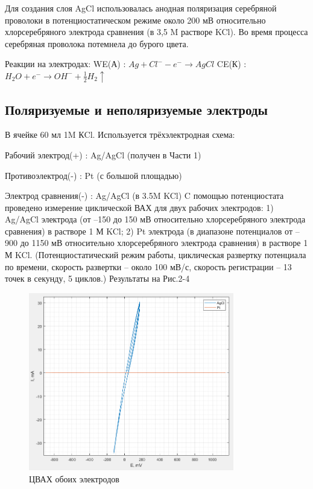 \documentclass[a4paper, 12pt]{article}
\begin{document}
Для создания слоя AgCl использовалась анодная поляризация серебряной проволоки в потенциостатическом режиме около 200 мВ относительно хлорсеребряного электрода сравнения (в 3,5 M растворе KCl). Во время процесса серебряная проволока потемнела до бурого цвета. 

Реакции на электродах: \newline
WE(А) : $Ag + Cl^- - e^- \rightarrow AgCl$ \newline
CE(К) : $H_{2}O + e^- \rightarrow OH^- + \frac{1}{2} H_2 \uparrow$

\subsection{Поляризуемые и неполяризуемые электроды}

В ячейке 60 мл 1M КCl. Используется трёхэлектродная схема:

Рабочий электрод(+) : Ag/AgCl (получен в Части 1)

Противоэлектрод(-) : Pt (с большой площадью)

Электрод сравнения(-) : Ag/AgCl (в 3.5M KCl) \newline
C помощью потенциостата проведено измерение циклической ВАХ для двух рабочих электродов:
1) Ag/AgCl электрода (от –150 до 150 мВ относительно хлорсеребряного
электрода сравнения) в растворе 1 М KCl;
2) Pt электрода (в диапазоне потенциалов от –900 до 1150 мВ относительно
хлорсеребряного электрода сравнения) в растворе 1 М KCl. \newline
(Потенциостатический режим работы, циклическая развертку потенциала по времени, скорость развертки – около 100 мВ/с, скорость регистрации – 13 точек в секунду, 5 циклов.)\newline
Результаты на Рис.2-4

\begin{figure}[h!]
    \begin{center}
    \includegraphics[width=0.8\textwidth]{2 both.png}
    \end{center}
    \caption{ЦВАХ обоих электродов}
\end{figure}
\end{document}
